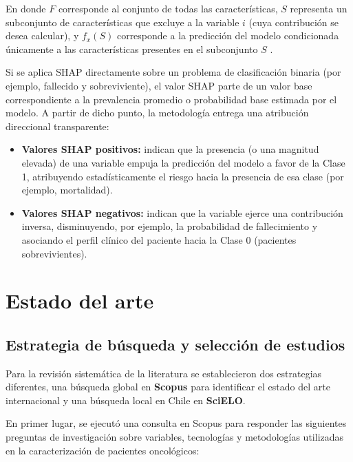 En donde $F$ corresponde al conjunto de todas las características, $S$ representa un subconjunto de características que excluye a la variable $i$ (cuya contribución se desea calcular), y $f_x(S)$ corresponde a la predicción del modelo condicionada únicamente a las características presentes en el subconjunto $S$ \cite{lundberg2017shap}.


Si se aplica SHAP directamente sobre un problema de clasificación binaria (por ejemplo, fallecido y sobreviviente), el valor SHAP parte de un valor base correspondiente a la prevalencia promedio o probabilidad base estimada por el modelo. A partir de dicho punto, la metodología entrega una atribución direccional transparente:

\begin{itemize}
    \item \textbf{Valores SHAP positivos:} indican que la presencia (o una magnitud elevada) de una variable empuja la predicción del modelo a favor de la Clase 1, atribuyendo estadísticamente el riesgo hacia la presencia de esa clase (por ejemplo, mortalidad).
    \item \textbf{Valores SHAP negativos:} indican que la variable ejerce una contribución inversa, disminuyendo, por ejemplo, la probabilidad de fallecimiento y asociando el perfil clínico del paciente hacia la Clase 0 (pacientes sobrevivientes).
\end{itemize}

\section{Estado del arte}

\subsection{Estrategia de búsqueda y selección de estudios}

Para la revisión sistemática de la literatura se establecieron dos estrategias diferentes, una búsqueda global en \textbf{Scopus} para identificar el estado del arte internacional y una búsqueda local en Chile en \textbf{SciELO}.


En primer lugar, se ejecutó una consulta en Scopus para responder las siguientes preguntas de investigación sobre variables, tecnologías y metodologías utilizadas en la caracterización de pacientes oncológicos:

